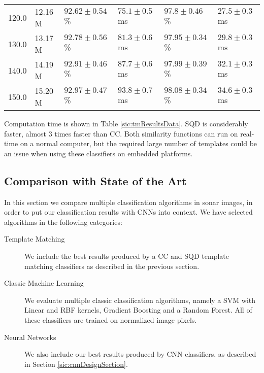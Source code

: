 \begin{table*}[t]
\begin{tabular}{llllll}
		120.0   & 12.16 M      & $ 92.62 \pm 0.54$ \%    &       $ 75.1 \pm 0.5$ ms & $ 97.8 \pm 0.46$ \%     &       $ 27.5 \pm 0.3$ ms\\
		130.0   & 13.17 M      & $ 92.78 \pm 0.56$ \%    &       $ 81.3 \pm 0.6$ ms & $ 97.95 \pm 0.34$ \%    &       $ 29.8 \pm 0.3$ ms\\
		140.0   & 14.19 M      & $ 92.91 \pm 0.46$ \%    &       $ 87.7 \pm 0.6$ ms & $ 97.99 \pm 0.39$ \%    &       $ 32.1 \pm 0.3$ ms\\
		150.0   & 15.20 M      & $ 92.97 \pm 0.47$ \%    &       $ 93.8 \pm 0.7$ ms & $ 98.08 \pm 0.34$ \%    &       $ 34.6 \pm 0.3$ ms\\
		\hline
	\end{tabular}
	\vspace*{0.5cm}
	\caption[Template Matching with Cross-Correlation and Sum of Squared Differences]{Template Matching with Cross-Correlation (CC) and Sum of Squared Differences (SQD). Accuracy, Number of Parameters and Computation versus Number of Templates per Class is presented. Number of parameters is expressed in Millions.}
	\label{sic:tmResultsData}
\end{table*}

Computation time is shown in Table \ref{sic:tmResultsData}. SQD is considerably faster, almost 3 times faster than CC. Both similarity functions can run on real-time on a normal computer, but the required large number of templates could be an issue when using these classifiers on embedded platforms.

\subsection{Comparison with State of the Art}

In this section we compare multiple classification algorithms in sonar images, in order to put our classification results with CNNs into context. We have selected algorithms in the following categories:

\begin{description}
	\item[Template Matching] We include the best results produced by a CC and SQD template matching classifiers as described in the previous section.
	\item[Classic Machine Learning] We evaluate multiple classic classification algorithms, namely a SVM with Linear and RBF kernels, Gradient Boosting and a Random Forest. All of these classifiers are trained on normalized image pixels.
	\item[Neural Networks] We also include our best results produced by CNN classifiers, as described in Section \ref{sic:cnnDesignSection}.
\end{description}

